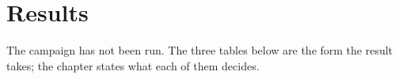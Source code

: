 \section{Results}\label{ch:app_wsel:results}
\label{ch:app_bo:validation}%
\label{ch:ofo:tuning:bo:validation}%
\label{ch:app_bo:cert_ratios}%
\label{ch:app_bo:recipe}%
\label{ch:ofo:tuning:bo:recipe}%

The campaign has not been run.
The three tables below are the form the result takes; the chapter states what each of them decides.

